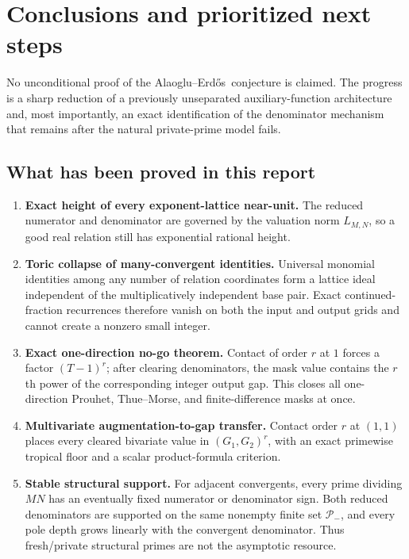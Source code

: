 \documentclass[11pt,oneside]{article}
\theoremstyle{definition}
\theoremstyle{remark}
\newcommand{\AEname}{Alaoglu--Erd\H{o}s}
\begin{document}
\section{Conclusions and prioritized next steps}
\label{sec:conclusion}

No unconditional proof of the \AEname\ conjecture is claimed.  The progress is a sharp
reduction of a previously unseparated auxiliary-function architecture and, most importantly,
an exact identification of the denominator mechanism that remains after the natural
private-prime model fails.

\subsection{What has been proved in this report}

\begin{enumerate}
\item \textbf{Exact height of every exponent-lattice near-unit.}
  The reduced numerator and denominator are governed by the valuation norm $L_{M,N}$, so a
  good real relation still has exponential rational height.

\item \textbf{Toric collapse of many-convergent identities.}
  Universal monomial identities among any number of relation coordinates form a lattice ideal
  independent of the multiplicatively independent base pair.  Exact continued-fraction
  recurrences therefore vanish on both the input and output grids and cannot create a nonzero
  small integer.

\item \textbf{Exact one-direction no-go theorem.}
  Contact of order $r$ at $1$ forces a factor $(T-1)^r$; after clearing denominators, the mask
  value contains the $r$th power of the corresponding integer output gap.  This closes all
  one-direction Prouhet, Thue--Morse, and finite-difference masks at once.

\item \textbf{Multivariate augmentation-to-gap transfer.}
  Contact order $r$ at $(1,1)$ places every cleared bivariate value in $(G_1,G_2)^r$, with an
  exact primewise tropical floor and a scalar product-formula criterion.

\item \textbf{Stable structural support.}
  For adjacent convergents, every prime dividing $MN$ has an eventually fixed numerator or
  denominator sign.  Both reduced denominators are supported on the same nonempty finite set
  $\mathcal P_-$, and every pole depth grows linearly with the convergent denominator.  Thus
  fresh/private structural primes are not the asymptotic resource.


\end{enumerate}
\end{document}
